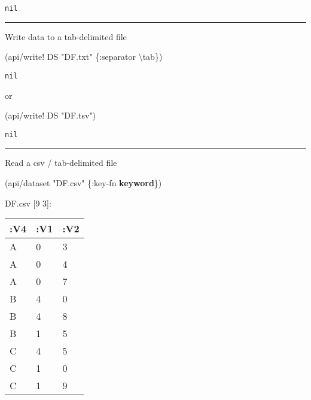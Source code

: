 \documentclass[]{article}
\newenvironment{Shaded}{\begin{snugshade}}{\end{snugshade}}
\newcommand{\AttributeTok}[1]{\textcolor[rgb]{0.77,0.63,0.00}{#1}}
\newcommand{\CharTok}[1]{\textcolor[rgb]{0.31,0.60,0.02}{#1}}
\newcommand{\KeywordTok}[1]{\textcolor[rgb]{0.13,0.29,0.53}{\textbf{#1}}}
\newcommand{\NormalTok}[1]{#1}
\newcommand{\StringTok}[1]{\textcolor[rgb]{0.31,0.60,0.02}{#1}}
\begin{document}
\begin{verbatim}
nil
\end{verbatim}

\begin{center}\rule{0.5\linewidth}{0.5pt}\end{center}

Write data to a tab-delimited file

\begin{Shaded}
\begin{Highlighting}[]
\NormalTok{(api/write! DS }\StringTok{"DF.txt"}\NormalTok{ \{}\AttributeTok{:separator} \CharTok{\textbackslash{}tab}\NormalTok{\})}
\end{Highlighting}
\end{Shaded}

\begin{verbatim}
nil
\end{verbatim}

or

\begin{Shaded}
\begin{Highlighting}[]
\NormalTok{(api/write! DS }\StringTok{"DF.tsv"}\NormalTok{)}
\end{Highlighting}
\end{Shaded}

\begin{verbatim}
nil
\end{verbatim}

\begin{center}\rule{0.5\linewidth}{0.5pt}\end{center}

Read a csv / tab-delimited file

\begin{Shaded}
\begin{Highlighting}[]
\NormalTok{(api/dataset }\StringTok{"DF.csv"}\NormalTok{ \{}\AttributeTok{:key-fn} \KeywordTok{keyword}\NormalTok{\})}
\end{Highlighting}
\end{Shaded}

DF.csv {[}9 3{]}:

\begin{longtable}[]{@{}lll@{}}
\toprule
:V4 & :V1 & :V2\tabularnewline
\midrule
\endhead
A & 0 & 3\tabularnewline
A & 0 & 4\tabularnewline
A & 0 & 7\tabularnewline
B & 4 & 0\tabularnewline
B & 4 & 8\tabularnewline
B & 1 & 5\tabularnewline
C & 4 & 5\tabularnewline
C & 1 & 0\tabularnewline
C & 1 & 9\tabularnewline
\bottomrule
\end{longtable}
\end{document}
